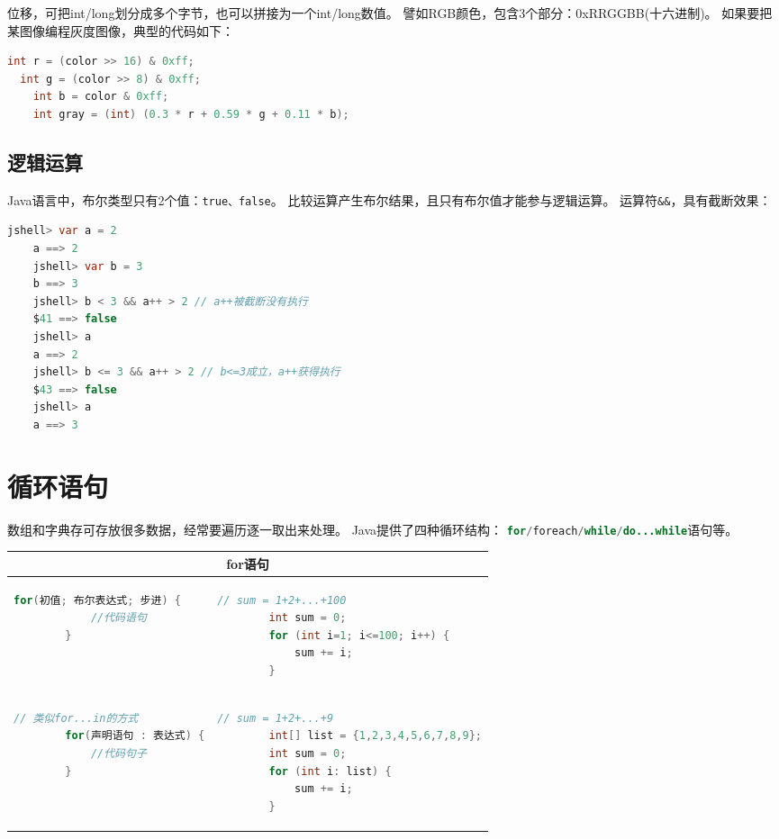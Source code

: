 位移，可把int/long划分成多个字节，也可以拼接为一个int/long数值。
譬如RGB颜色，包含3个部分：0xRRGGBB(十六进制)。
如果要把某图像编程灰度图像，典型的代码如下：

\begin{lstlisting}[language=Java]
	int r = (color >> 16) & 0xff;
  int g = (color >> 8) & 0xff;
	int b = color & 0xff;
	int gray = (int) (0.3 * r + 0.59 * g + 0.11 * b);
\end{lstlisting}


\subsection{逻辑运算}
Java语言中，布尔类型只有2个值：\lstinline[language=Java]{true、false}。
比较运算产生布尔结果，且只有布尔值才能参与逻辑运算。
运算符\lstinline{&&}，具有截断效果：

\begin{lstlisting}[language=Java, backgroundcolor=\color{lightgray!10}]
	jshell> var a = 2
	a ==> 2
	jshell> var b = 3
	b ==> 3
	jshell> b < 3 && a++ > 2 // a++被截断没有执行
	$41 ==> false
	jshell> a
	a ==> 2
	jshell> b <= 3 && a++ > 2 // b<=3成立，a++获得执行
	$43 ==> false
	jshell> a
	a ==> 3
\end{lstlisting}

\section{循环语句}
数组和字典存可存放很多数据，经常要遍历逐一取出来处理。
Java提供了四种循环结构：
\lstinline[language=Java]{for/foreach/while/do...while}语句等。
\bigskip 

\begin{table}[!htbp]\centering
	\lstset{frame=none, aboveskip=0mm, belowskip=0mm}
	\begin{tabular}{|p{6cm}|p{7cm}|}
	\hline
	\multicolumn{2}{|c|}{for语句}\\
	\hline
	\begin{lstlisting}[language=Java]
		for(初值; 布尔表达式; 步进) {
			//代码语句
		}
	\end{lstlisting}
	&
	\begin{lstlisting}[language=Java]
		// sum = 1+2+...+100
		int sum = 0;
		for (int i=1; i<=100; i++) {
			sum += i;
		}
	\end{lstlisting} \\
	\hline
	\begin{lstlisting}[language=Java]
		// 类似for...in的方式
		for(声明语句 : 表达式) {
			//代码句子
		}
	\end{lstlisting}
	&
	\begin{lstlisting}[language=Java]
		// sum = 1+2+...+9
		int[] list = {1,2,3,4,5,6,7,8,9};
		int sum = 0;
		for (int i: list) {
			sum += i;
		}
	\end{lstlisting} \\
	\hline
	\end{tabular}
\end{table}

